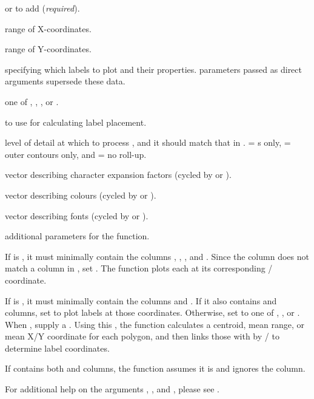 \documentclass[letterpaper]{book}
\begin{document}
\begin{Arguments}
\begin{ldescription}
\item[\code{data}]  or  to add (\emph{required}).
\item[\code{xlim}] range of X-coordinates.
\item[\code{ylim}] range of Y-coordinates.
\item[\code{polyProps}]  specifying which labels to plot and their
properties.   parameters passed as direct arguments
supersede these data.
\item[\code{placement}] one of , ,
, or .
\item[\code{polys}]  to use for calculating label placement.
\item[\code{rollup}] level of detail at which to process , and it
should match that in .   = s only,
 = outer contours only, and  = no roll-up.
\item[\code{cex}] vector describing character expansion factors (cycled by
 or ).
\item[\code{col}] vector describing colours (cycled by  or
).
\item[\code{font}] vector describing fonts (cycled by  or
).
\item[\code{...}] additional  parameters for the
 function.
\end{ldescription}
\end{Arguments}
%
\begin{Details}\relax
If  is , it must minimally contain the columns
, , , and .  Since the
 column does not match a column in , set
.  The function plots each  at
its corresponding / coordinate.

If  is , it must minimally contain the columns
 and .  If it also contains  and
 columns, set  to plot labels at
those coordinates.  Otherwise, set  to one of
, , or .  When
, supply a  .  Using this
, the function calculates a centroid, mean range, or mean X/Y
coordinate for each polygon, and then links those  with
 by / to determine label
coordinates.

If  contains both  and  columns, the
function assumes it is  and ignores the 
column.

For additional help on the arguments , , and
, please see .
\end{Details}
\end{document}
